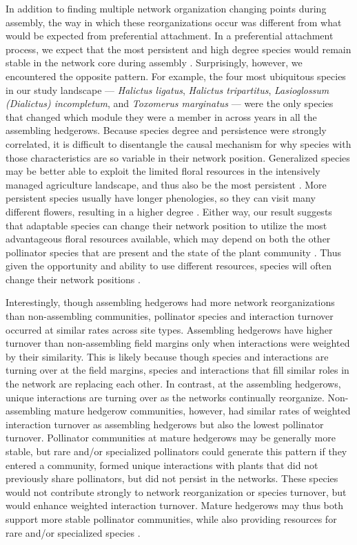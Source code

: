 \documentclass[12pt]{article}
\begin{document}
In addition to finding multiple network organization changing points
during assembly, the way in which these reorganizations occur was
different from what would be expected from preferential
attachment. In a preferential attachment process, we expect that the
most persistent and high degree species would remain stable in the
network core during assembly
\citep{barabasi1999emergence}. Surprisingly, however, we encountered
the opposite pattern. For example, the four most ubiquitous species in
our study landscape --- \textit{Halictus ligatus}, \textit{Halictus
  tripartitus}, \textit{Lasioglossum (Dialictus) incompletum}, and
\textit{Toxomerus marginatus} --- were the only species that changed
which module they were a member in across years in all the assembling
hedgerows. Because species degree and persistence were strongly
correlated, it is difficult to disentangle the causal mechanism for
why species with those characteristics are so variable in their
network position. Generalized species may be better able to exploit
the limited floral resources in the intensively managed agriculture
landscape, and thus also be the most persistent \citep[in ant-plant
mutualisms, ][]{diaz2010changes}. More persistent species usually have
longer phenologies, so they can visit many different flowers,
resulting in a higher degree \citep{Vazquez2009,
  fort2016abundance}. Either way, our result suggests that adaptable
species can change their network position to utilize the most
advantageous floral resources available, which may depend on both the
other pollinator species that are present and the state of the plant
community \citep{macleod2016measuring, gomez2006ecological,
  Waser1996}. Thus given the opportunity and ability to
use different resources, species will often change their network
positions \citep{macleod2016measuring}.

Interestingly, though assembling hedgerows had more network
reorganizations than non-assembling communities, pollinator species
and interaction turnover occurred at similar rates across site types.
Assembling hedgerows have higher turnover than non-assembling field
margins only when interactions were weighted by their similarity. This
is likely because though species and interactions are turning over at
the field margins, species and interactions that fill similar roles in
the network are replacing each other. In contrast, at the assembling
hedgerows, unique interactions are turning over as the networks
continually reorganize. Non-assembling mature hedgerow communities,
however, had similar rates of weighted interaction turnover as
assembling hedgerows but also the lowest pollinator
turnover. Pollinator communities at mature hedgerows may be generally
more stable, but rare and/or specialized pollinators could generate
this pattern if they entered a community, formed unique interactions
with plants that did not previously share pollinators, but did not
persist in the networks. These species would not contribute strongly
to network reorganization or species turnover, but would enhance
weighted interaction turnover. Mature hedgerows may thus both support
more stable pollinator communities, while also providing resources for
rare and/or specialized species \citep{kremen-2015-602,
  mgonigle-2015-x}.
\end{document}
